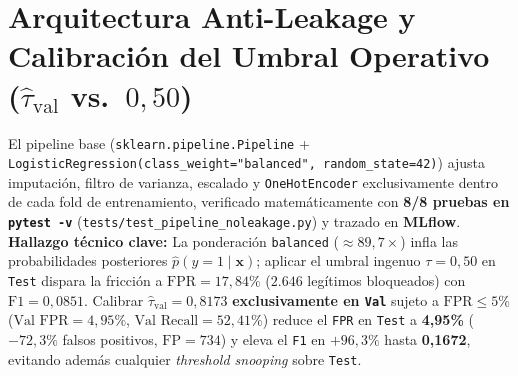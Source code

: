 \documentclass[9pt,letterpaper]{article}
\begin{document}
\section{Arquitectura Anti-Leakage y Calibración del Umbral Operativo ($\hat{\tau}_{\text{val}}$ vs.\ $0,50$)}
El pipeline base (\texttt{sklearn.pipeline.Pipeline} + \texttt{LogisticRegression(class\_weight="balanced", random\_state=42)}) ajusta imputación, filtro de varianza, escalado y \texttt{OneHotEncoder} exclusivamente dentro de cada fold de entrenamiento, verificado matemáticamente con \textbf{8/8 pruebas en \texttt{pytest -v}} (\texttt{tests/test\_pipeline\_noleakage.py}) y trazado en \textbf{MLflow}. \textbf{Hallazgo técnico clave:} La ponderación \texttt{balanced} ($\approx 89,7\times$) infla las probabilidades posteriores $\hat{p}(y=1\mid\mathbf{x})$; aplicar el umbral ingenuo $\tau=0,50$ en \texttt{Test} dispara la fricción a \textbf{$\text{FPR}=17,84\%$} ($2.646$ legítimos bloqueados) con $\text{F1}=0,0851$. Calibrar $\hat{\tau}_{\text{val}}=0,8173$ \textbf{exclusivamente en \texttt{Val}} sujeto a $\text{FPR}\le 5\%$ ($\text{Val FPR}=4,95\%$, $\text{Val Recall}=52,41\%$) reduce el \texttt{FPR} en \texttt{Test} a \textbf{4,95\%} ($-72,3\%$ falsos positivos, $\text{FP}=734$) y eleva el \texttt{F1} en $+96,3\%$ hasta \textbf{0,1672}, evitando además cualquier \textit{threshold snooping} sobre \texttt{Test}.
\end{document}
